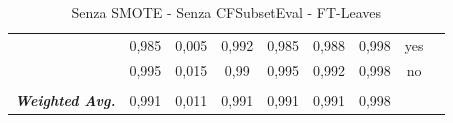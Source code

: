 \begin{table}[htbp]
{\begin{tabular}{rrrrrrrrr}
			\multicolumn{1}{c}{} & \multicolumn{1}{c}{0,985} & \multicolumn{1}{c}{0,005} & \multicolumn{1}{c}{0,992} & \multicolumn{1}{c}{0,985} & \multicolumn{1}{c}{0,988} & \multicolumn{1}{c}{0,998} & \multicolumn{1}{c}{yes} &  \\
			\multicolumn{1}{c}{} & \multicolumn{1}{c}{0,995} & \multicolumn{1}{c}{0,015} & \multicolumn{1}{c}{0,99} & \multicolumn{1}{c}{0,995} & \multicolumn{1}{c}{0,992} & \multicolumn{1}{c}{0,998} & \multicolumn{1}{c}{no} &  \\
			\multicolumn{1}{c}{} & \multicolumn{1}{c}{} & \multicolumn{1}{c}{} & \multicolumn{1}{c}{} & \multicolumn{1}{c}{} & \multicolumn{1}{c}{} & \multicolumn{1}{c}{} & \multicolumn{1}{c}{} &  \\
			\multicolumn{1}{c}{\textit{\textbf{Weighted Avg.}}} & \multicolumn{1}{c}{0,991} & \multicolumn{1}{c}{0,011} & \multicolumn{1}{c}{0,991} & \multicolumn{1}{c}{0,991} & \multicolumn{1}{c}{0,991} & \multicolumn{1}{c}{0,998} & \multicolumn{1}{c}{} &  \\
		\end{tabular}%
	}
	\label{tab:FTLeaves}%
	\caption{ Senza SMOTE - Senza CFSubsetEval - FT-Leaves}
\end{table}%


